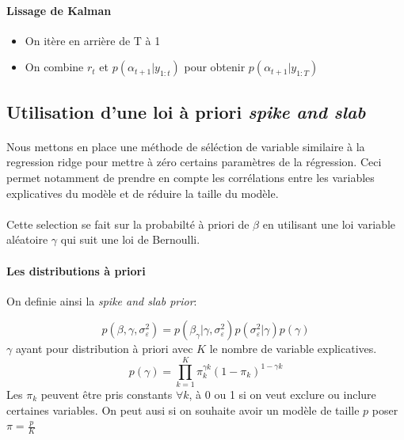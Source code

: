 \documentclass{article}
\theoremstyle{definition}
\theoremstyle{remark}
\begin{document}
\paragraph{Lissage de Kalman}
\begin{itemize}
    \item On itère en arrière de T à 1
    \item On combine $r_t$ et $p\left(\alpha_{t+1} | y_{1: t}\right)$ pour obtenir $p\left(\alpha_{t+1} | y_{1: T}\right)$
\end{itemize}


\subsection{Utilisation d'une loi à priori \textit{spike and slab}}
\paragraph{}
Nous mettons en place une méthode de séléction de variable similaire à la regression ridge pour \og{} mettre à zéro \fg{}  certains paramètres de la régression. Ceci permet notamment 
de prendre en compte les corrélations entre les variables explicatives du modèle et de réduire la taille du modèle.

\paragraph{}
Cette selection se fait sur la probabilté à priori de $\beta$ en utilisant une loi 
variable aléatoire $\gamma$ qui suit une loi de Bernoulli. \\

\paragraph{Les distributions à priori \\}
On definie ainsi la \textit{spike and slab prior}:

\begin{equation}
	p\left(\beta, \gamma, \sigma_{\varepsilon}^{2}\right)=p\left(\beta_{\gamma} | \gamma, \sigma_{\varepsilon}^{2}\right) p\left(\sigma_{\varepsilon}^{2} | \gamma\right) p(\gamma)
\end{equation}
$\gamma$ ayant pour distribution à priori avec $K$ le nombre de variable explicatives.
\begin{equation}
	p(\gamma)=\prod_{k=1}^{K} \pi_k^{\gamma k}(1-\pi_k)^{1-\gamma k}
\end{equation}
Les $\pi_k$ peuvent être pris constants $ \forall k$, à 0 ou 1 si on veut exclure ou inclure certaines variables. On peut ausi
si on souhaite avoir un modèle de taille $p$ poser $\pi = \frac{p}{K}$
\end{document}

